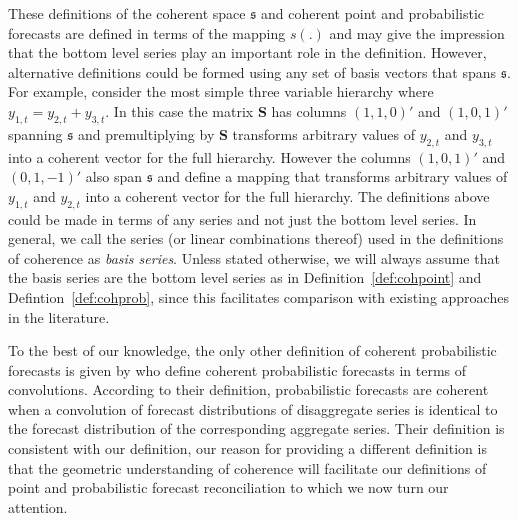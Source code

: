 \documentclass[a4paper, 11pt]{article}
\theoremstyle{theo}
\theoremstyle{definition}
\begin{document}
These definitions of the coherent space $\mathfrak{s}$ and coherent point and probabilistic forecasts are defined in terms of the mapping $s(.)$ and may give the impression that the bottom level series play an important role in the definition.  However, alternative definitions could be formed using any set of basis vectors that spans $\mathfrak{s}$. For example, consider the most simple three variable hierarchy where $y_{1,t}=y_{2,t}+y_{3,t}$.  In this case the matrix $\bm{S}$ has columns  $(1,1,0)'$ and $(1,0,1)'$ spanning $\mathfrak{s}$ and premultiplying by $\bm{S}$ transforms arbitrary values of $y_{2,t}$ and $y_{3,t}$ into a coherent vector for the full hierarchy.  However the columns $(1,0,1)'$ and $(0,1,-1)'$ also span $\mathfrak{s}$ and define a mapping that transforms arbitrary values of $y_{1,t}$ and $y_{2,t}$ into a coherent vector for the full hierarchy.  The definitions above could be made in terms of any series and not just the bottom level series.  In general, we call the series (or linear combinations thereof) used in the definitions of coherence as \textit{basis series}.  Unless stated otherwise, we will always assume that the basis series are the bottom level series as in Definition~\ref{def:cohpoint} and Defintion~\ref{def:cohprob}, since this facilitates comparison with existing approaches in the literature.


To  the best of our knowledge, the only other definition of coherent probabilistic forecasts is given by \citet{BenTaieb2017} who define coherent probabilistic forecasts in terms of convolutions. According to their definition, probabilistic forecasts are coherent when a convolution of forecast distributions of disaggregate series is identical to the forecast distribution of the corresponding aggregate series.  Their definition is consistent with our definition, our reason for providing a different definition is that the geometric understanding of coherence will facilitate our definitions of point and probabilistic forecast reconciliation to which we now turn our attention.
\end{document}
